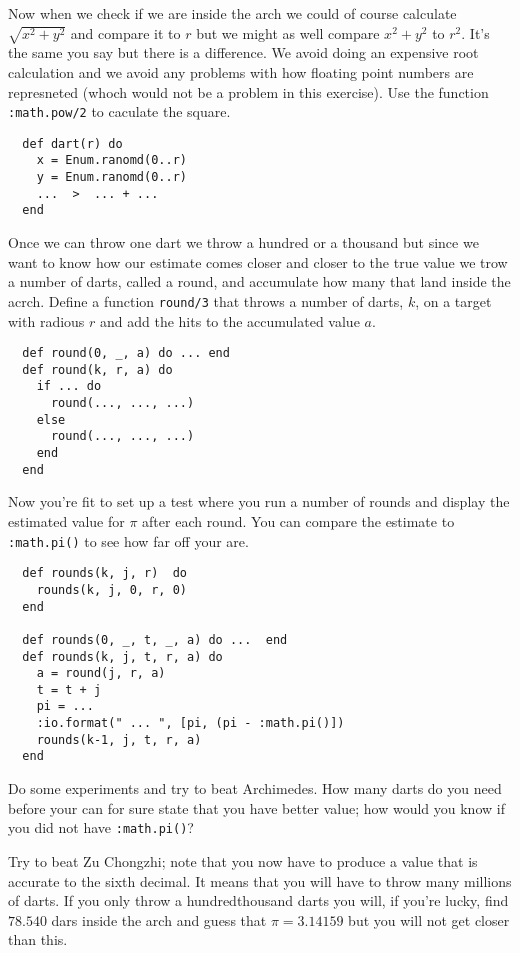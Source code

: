 \documentclass[a4paper,11pt]{article}
\begin{document}
Now when we check if we are inside the arch we could of course
calculate $\sqrt{x^2 + y^2}$ and compare it to $r$ but we might as
well compare $x^2 + y^2$ to $r^2$. It's the same you say but there is
a difference. We avoid doing an expensive root calculation and we
avoid any problems with how floating point numbers are represneted
(whoch would not be a problem in this exercise). Use the function {\tt
  :math.pow/2} to caculate the square.

\begin{verbatim}
  def dart(r) do
    x = Enum.ranomd(0..r)
    y = Enum.ranomd(0..r)
    ...  >  ... + ... 
  end
\end{verbatim}

Once we can throw one dart we throw a hundred or a thousand but since
we want to know how our estimate comes closer and closer to the true
value we trow a number of darts, called a round, and accumulate how
many that land inside the acrch. Define a function {\tt round/3} that
throws a number of darts, $k$, on a target with radious $r$ and add
the hits to the accumulated value $a$.

\begin{verbatim}
  def round(0, _, a) do ... end
  def round(k, r, a) do
    if ... do
      round(..., ..., ...)
    else
      round(..., ..., ...)	
    end
  end
\end{verbatim}

Now you're fit to set up a test where you run a number of rounds and
display the estimated value for $\pi$ after each round. You can
compare the estimate to {\tt :math.pi()} to see how far off your are.


\begin{verbatim}
  def rounds(k, j, r)  do
    rounds(k, j, 0, r, 0)
  end
  
  def rounds(0, _, t, _, a) do ...  end
  def rounds(k, j, t, r, a) do
    a = round(j, r, a)
    t = t + j
    pi = ...
    :io.format(" ... ", [pi, (pi - :math.pi()])
    rounds(k-1, j, t, r, a)
  end
\end{verbatim}

Do some experiments and try to beat Archimedes. How many darts do you
need before your can for sure state that you have better value; how
would you know if you did not have {\tt :math.pi()}?

Try to beat Zu Chongzhi; note that you now have to produce a value
that is accurate to the sixth decimal. It means that you will have to
throw many millions of darts. If you only throw a hundredthousand
darts you will, if you're lucky, find $78.540$ dars inside the arch
and guess that $\pi = 3.14159$ but you will not get closer than this.
\end{document}
